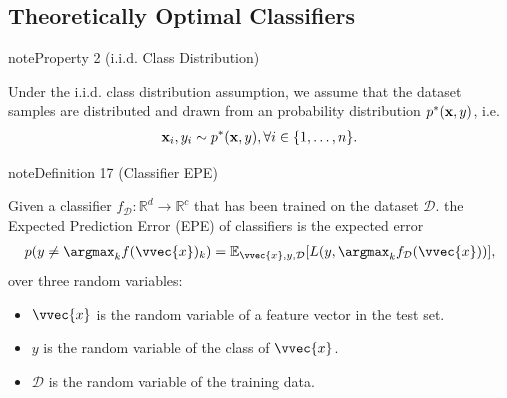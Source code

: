 \documentclass[letterpaper,10pt,english]{jupyterBook}
\begin{document}
\subsection{Theoretically Optimal Classifiers}
\label{\detokenize{classification_problem:theoretically-optimal-classifiers}}\label{classification_problem:property-2}
\begin{sphinxadmonition}{note}{Property 2 (i.i.d. Class Distribution)}



\sphinxAtStartPar
Under the i.i.d. class distribution assumption, we assume that the dataset samples are  distributed and  drawn from an  probability distribution \( p^{\ast}({\bf x}, y) \), i.e.
\begin{equation}\label{equation:classification_problem:iid_assumption}
\begin{split}{\bf x}_{i}, y_{i} \sim  p^{\ast}({\bf x}, y), \forall i \in \lbrace 1, \ldots, n \rbrace.\end{split}
\end{equation}\end{sphinxadmonition}
\label{classification_problem:true_classifier_error}
\begin{sphinxadmonition}{note}{Definition 17 (Classifier EPE)}



\sphinxAtStartPar
Given a classifier \(f_\mathcal{D}:\mathbb{R}^d\rightarrow \mathbb{R}^c\) that has been trained on the dataset \(\mathcal{D}\).
the Expected Prediction Error (EPE) of classifiers is the expected error
\begin{equation}\label{equation:classification_problem:true_classification_error}
\begin{split}p( y \neq \argmax_{k} f(\vvec{x})_k ) = \mathbb{E}_{\vvec{x},y,\mathcal{D}} [L (y, \argmax_k f_\mathcal{D}(\vvec{x}) )] ,\end{split}
\end{equation}
\sphinxAtStartPar
over three random variables:
\begin{itemize}
\item {} 
\sphinxAtStartPar
\(\vvec{x}\) is the random variable of a feature vector in the test set.

\item {} 
\sphinxAtStartPar
\(y\) is the random variable of the class of \(\vvec{x}\).

\item {} 
\sphinxAtStartPar
\(\mathcal{D}\) is the random variable of the training data.

\end{itemize}
\end{sphinxadmonition}
\end{document}
